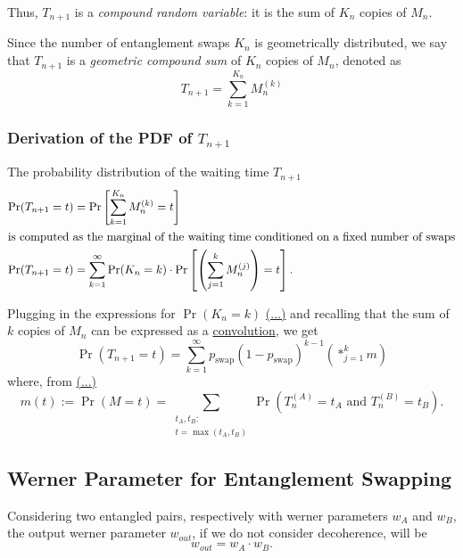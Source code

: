 \documentclass{masterthesis}
\begin{document}
Thus, $T_{n+1}$ is a \textit{compound random variable}: it is the sum of $K_n$ copies of $M_n$. 

Since the number of entanglement swaps $K_n$ is geometrically distributed, we say that $T_{n+1}$ is a \textit{geometric compound sum} of $K_n$ copies of $M_n$, denoted as
\begin{equation}
    T_{n+1}=\sum_{k=1}^{K_{n}} M_{n}^{(k)}
\end{equation}

\subsubsection*{Derivation of the PDF of $T_{n+1}$}

The probability distribution of the waiting time $T_{n+1}$
\begin{align}
    \Pr(T_{n+1} = t) &= \Pr\left[\sum_{k=1}^{K_{n}} M_{n}^{(k)} = t\right] \nonumber \\
    \intertext{is computed as the marginal of the waiting time conditioned on a fixed number of swaps}
    \Pr(T_{n+1} = t) &= \sum_{k=1}^{\infty} \Pr(K_{n} = k) \cdot \Pr\left[\left( \sum_{j=1}^{k} M_{n}^{(j)} \right) = t\right].
\end{align}

Plugging in the expressions for $\Pr(K_n = k)$ \hyperref[eq:pdf_swap_steps]{(...)} and recalling that the sum of $k$ copies of $M_n$ can be expressed as a \hyperref[eq:convolution]{convolution}, we get
\begin{equation}
    \Pr(T_{n+1} = t) = \sum_{k=1}^{\infty} p_{\text{swap}}(1 - p_{\text{swap}})^{k-1} \left( \ast_{j=1}^{k} m \right)
\end{equation}
where, from \hyperref[eq:pdf_waiting_time_pair]{(...)}
\begin{equation*}
    m(t) := \Pr(M = t) = \sum_{\substack{t_A, t_B: \\ t = \max(t_A, t_B)}} \Pr(T_n^{(A)} = t_A \text{ and } T_n^{(B)} = t_B) .
\end{equation*}

\subsection*{Werner Parameter for Entanglement Swapping}

Considering two entangled pairs, respectively with werner parameters $w_A$ and $w_B$, the output werner parameter $w_{out}$, if we do not consider decoherence, will be %
\begin{equation}
    w_{out} = w_A \cdot w_B .
\end{equation}
\end{document}

